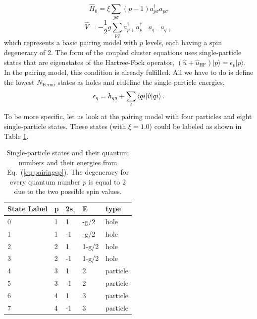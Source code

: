   \begin{equation}
  \hat{H}_0 = \xi \sum_{p \sigma} (p-1) a^{\dagger}_{p \sigma} a_{p
    \sigma}\label{eq:sppairing}
  \end{equation}
  \begin{equation}
  \hat{V} = -\frac{1}{2}g \sum_{pq} a^{\dagger}_{p+}a^{\dagger}_{p-}
  a_{q-}a_{q+}\label{eq:intpairing}
  \end{equation}
  which represents a basic pairing model with $p$ levels, each having a
  spin degeneracy of 2. The form of the coupled cluster equations 
  uses single-particle states that are eigenstates of the
  Hartree-Fock operator, $\left(\hat{u}+\hat{u}_{\text{HF}}\right)\vert
  p\rangle=\epsilon_{p}\vert p\rangle$. In the pairing model, this
  condition is already fulfilled. All we have to do is define the
  lowest $N_{\mathrm{Fermi}}$ states as holes and  redefine the single-particle
  energies,
  \begin{equation}\label{eq:pairingsp}
  \epsilon_q = h_{qq} + \sum_{i} \braket{qi|\hat{v}|qi}.
  \end{equation}
  To be more specific, let us look at the pairing model with four
  particles and eight single-particle states. These states (with $\xi =1.0$) could be labeled as shown in 
Table \ref{tab:pairingmodelsp}.
\begin{table}
\caption{Single-particle states and their quantum numbers and their energies from Eq.~(\ref{eq:pairingsp}). The degeneracy for every quantum number $p$ is equal to 2 due to the two possible spin values.} \label{tab:pairingmodelsp}
  \begin{center}
      \begin{tabular}{| l | l | l | l | l |}
      \hline State Label & p & 2s$_z$ & E & type\\ \hline 0 & 1 & 1 &
      -g/2 & hole \\ \hline 1 & 1 & -1 & -g/2 & hole \\ \hline 2 & 2 &
      1 & 1-g/2 & hole \\ \hline 3 & 2 & -1 & 1-g/2 & hole \\ \hline 4
      & 3 & 1 & 2 & particle \\ \hline 5 & 3 & -1 & 2 & particle
      \\ \hline 6 & 4 & 1 & 3 & particle \\ \hline 7 & 4 & -1 & 3 &
      particle \\ \hline
      \end{tabular}
  \end{center}
\end{table}
